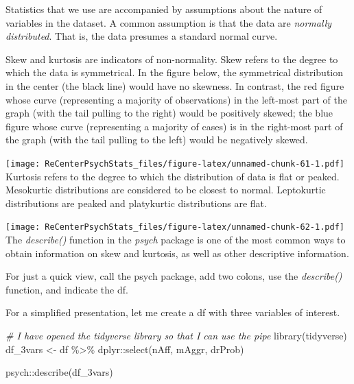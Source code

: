 \documentclass[
  11pt,
]{book}
\newenvironment{Shaded}{\begin{snugshade}}{\end{snugshade}}
\newcommand{\CommentTok}[1]{\textcolor[rgb]{0.56,0.35,0.01}{\textit{#1}}}
\newcommand{\FunctionTok}[1]{\textcolor[rgb]{0.00,0.00,0.00}{#1}}
\newcommand{\NormalTok}[1]{#1}
\newcommand{\OtherTok}[1]{\textcolor[rgb]{0.56,0.35,0.01}{#1}}
\newcommand{\SpecialCharTok}[1]{\textcolor[rgb]{0.00,0.00,0.00}{#1}}
\begin{document}
Statistics that we use are accompanied by assumptions about the nature of variables in the dataset. A common assumption is that the data are \emph{normally distributed}. That is, the data presumes a standard normal curve.

Skew and kurtosis are indicators of non-normality. Skew refers to the degree to which the data is symmetrical. In the figure below, the symmetrical distribution in the center (the black line) would have no skewness. In contrast, the red figure whose curve (representing a majority of observations) in the left-most part of the graph (with the tail pulling to the right) would be positively skewed; the blue figure whose curve (representing a majority of cases) is in the right-most part of the graph (with the tail pulling to the left) would be negatively skewed.

\texttt{[image: ReCenterPsychStats\_files/figure-latex/unnamed-chunk-61-1.pdf]}
Kurtosis refers to the degree to which the distribution of data is flat or peaked. Mesokurtic distributions are considered to be closest to normal. Leptokurtic distributions are peaked and platykurtic distributions are flat.

\texttt{[image: ReCenterPsychStats\_files/figure-latex/unnamed-chunk-62-1.pdf]}
The \emph{describe()} function in the \emph{psych} package is one of the most common ways to obtain information on skew and kurtosis, as well as other descriptive information.

For just a quick view, call the psych package, add two colons, use the \emph{describe()} function, and indicate the df.

For a simplified presentation, let me create a df with three variables of interest.

\begin{Shaded}
\begin{Highlighting}[]
\CommentTok{\# I have opened the tidyverse library so that I can use the pipe}
\FunctionTok{library}\NormalTok{(tidyverse)}
\NormalTok{df\_3vars }\OtherTok{\textless{}{-}}\NormalTok{ df }\SpecialCharTok{\%\textgreater{}\%}
\NormalTok{    dplyr}\SpecialCharTok{::}\FunctionTok{select}\NormalTok{(nAff, mAggr, drProb)}
\end{Highlighting}
\end{Shaded}

\begin{Shaded}
\begin{Highlighting}[]
\NormalTok{psych}\SpecialCharTok{::}\FunctionTok{describe}\NormalTok{(df\_3vars)}
\end{Highlighting}
\end{Shaded}
\end{document}
